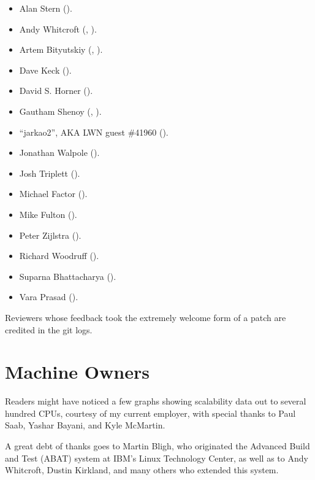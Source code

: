 \begin{itemize}
\item	Alan Stern ().
\item	Andy Whitcroft (,
	).
\item	Artem Bityutskiy (,
	).
\item	Dave Keck ().
\item	David S. Horner
	().
\item	Gautham Shenoy (,
	).
\item	``jarkao2'', AKA LWN guest \#41960 ().
\item	Jonathan Walpole ().
\item	Josh Triplett ().
\item	Michael Factor ().
\item	Mike Fulton ().
\item	Peter Zijlstra
	(). %
\item	Richard Woodruff ().
\item	Suparna Bhattacharya ().
\item	Vara Prasad
	().
\end{itemize}

Reviewers whose feedback took the extremely welcome form of a patch
are credited in the git logs.

\section{Machine Owners}

Readers might have noticed a few graphs showing scalability data out
to several hundred CPUs, courtesy of my current employer, with special
thanks to Paul Saab, Yashar Bayani, and Kyle McMartin.

A great debt of thanks goes to Martin Bligh, who originated the
Advanced Build and Test (ABAT) system at IBM's Linux Technology
Center, as well as to Andy Whitcroft, Dustin Kirkland, and many
others who extended this system.

